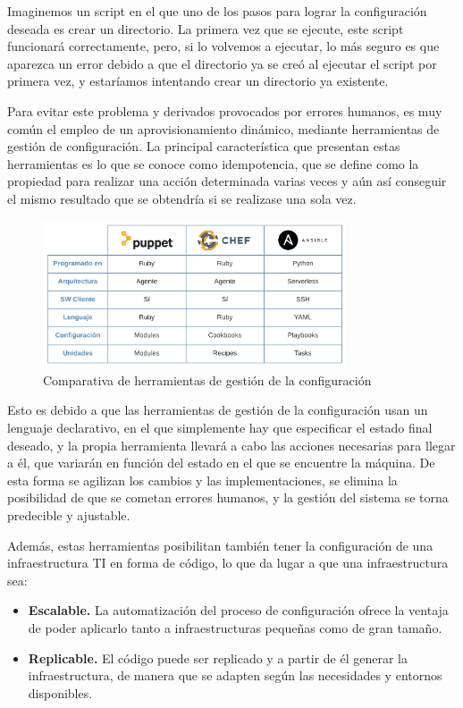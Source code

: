 	Imaginemos un script en el que uno de los pasos para lograr la configuración deseada es crear un directorio. La primera vez que se ejecute, este script funcionará correctamente, pero, si lo volvemos a ejecutar, lo más seguro es que aparezca un error debido a que el directorio ya se creó al ejecutar el script por primera vez, y estaríamos intentando crear un directorio ya existente. 

	Para evitar este problema y derivados provocados por errores humanos, es muy común el empleo de un aprovisionamiento dinámico, mediante herramientas de gestión de configuración. La principal característica que presentan estas herramientas es lo que se conoce como idempotencia, que se define como la propiedad para realizar una acción determinada varias veces y aún así conseguir el mismo resultado que se obtendría si se realizase una sola vez.
	
	\begin{figure}[h]
	\centering
	\includegraphics[width=0.8\textwidth]{../imgs/EdA/aprovisionamiento.png}
	\caption{Comparativa de herramientas de gestión de la configuración}
	\label{fig:aproVS}
	\end{figure}

	Esto es debido a que las herramientas de gestión de la configuración usan un lenguaje declarativo, en el que simplemente hay que especificar el estado final deseado, y la propia herramienta llevará a cabo las acciones necesarias para llegar a él, que variarán en función del estado en el que se encuentre la máquina. De esta forma se agilizan los cambios y las implementaciones, se elimina la posibilidad de que se cometan errores humanos, y la gestión del sistema se torna predecible y ajustable.~\cite{aprov2}

	Además, estas herramientas posibilitan también tener la configuración de una infraestructura TI en forma de código, lo que da lugar a que una infraestructura sea:

	\begin{itemize}
		\item \textbf{Escalable.} La automatización del proceso de configuración ofrece la ventaja de poder aplicarlo tanto a infraestructuras pequeñas como de gran tamaño.
		\item \textbf{Replicable.} El código puede ser replicado y a partir de él generar la infraestructura, de manera que se adapten según las necesidades y entornos disponibles.
	\end{itemize}

